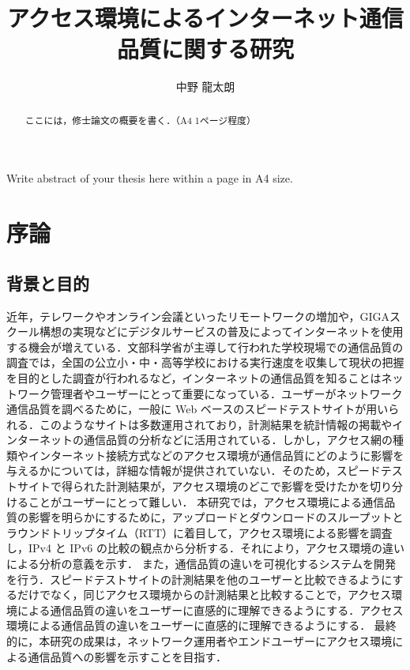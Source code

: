 \documentclass[12pt]{mthesis_utf8}
\title{アクセス環境によるインターネット通信品質に関する研究}
\author{中野 龍太朗}
\begin{document}
\maketitle
\begin{abstract}
ここには，修士論文の概要を書く．（A4 1ページ程度）
\end{abstract}

\begin{eabstract}
Write abstract of your thesis here within a page in A4 size.
\end{eabstract}



\chapter{序論}
\section{背景と目的}
近年，テレワークやオンライン会議といったリモートワークの増加\cite{telwork}や，GIGAスクール構想の実現などにデジタルサービスの普及によってインターネットを使用する機会が増えている．文部科学省が主導して行われた学校現場での通信品質の調査\cite{giga}では，全国の公立小・中・高等学校における実行速度を収集して現状の把握を目的とした調査が行われるなど，インターネットの通信品質を知ることはネットワーク管理者やユーザーにとって重要になっている．ユーザーがネットワーク通信品質を調べるために，一般に Web ベースのスピードテストサイトが用いられる．このようなサイトは多数運用されており，計測結果を統計情報の掲載やインターネットの通信品質の分析などに活用されている．しかし，アクセス網の種類やインターネット接続方式などのアクセス環境が通信品質にどのように影響を与えるかについては，詳細な情報が提供されていない．そのため，スピードテストサイトで得られた計測結果が，アクセス環境のどこで影響を受けたかを切り分けることがユーザーにとって難しい．
本研究では，アクセス環境による通信品質の影響を明らかにするために，アップロードとダウンロードのスループットとラウンドトリップタイム（RTT）に着目して，アクセス環境による影響を調査し，IPv4 と IPv6 の比較の観点から分析する．それにより，アクセス環境の違いによる分析の意義を示す．
また，通信品質の違いを可視化するシステムを開発を行う．スピードテストサイトの計測結果を他のユーザーと比較できるようにするだけでなく，同じアクセス環境からの計測結果と比較することで，アクセス環境による通信品質の違いをユーザーに直感的に理解できるようにする．アクセス環境による通信品質の違いをユーザーに直感的に理解できるようにする．
最終的に，本研究の成果は，ネットワーク運用者やエンドユーザーにアクセス環境による通信品質への影響を示すことを目指す．
\end{document}
